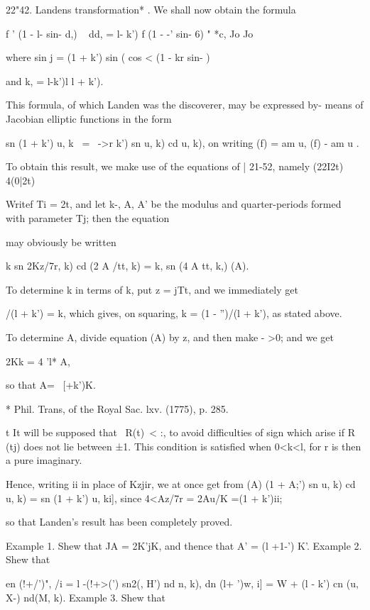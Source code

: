  22"42. Landens transformation* . We shall now obtain the
formula

f ' (1 - l- sin- d,) ~ dd, = l- k') f (1 - -' sin- 6) " *c, Jo Jo

where sin j = (1 + k') sin ( cos < (1 - kr sin- ) ~

and k, = l-k')l l + k').

This formula, of which Landen was the discoverer, may be expressed by-
means of Jacobian elliptic functions in the form

sn (1 + k') u, k \ = \ ->r k') sn u, k) cd u, k), on writing (f) = am
u, (f) - am u .

To obtain this result, we make use of the equations of | 21-52, namely
(22I2t) 4(0|2t)

Writef Ti = 2t, and let k-, A, A' be the modulus and quarter-periods
formed with parameter Tj; then the equation


may obviously be written

k sn 2Kz/7r, k) cd (2 A /tt, k) = k, sn (4 A tt, k,) (A).

To determine k in terms of k, put z = jTt, and we immediately get

  /(l + k') = k, which gives, on squaring, k = (1 - '')/(l + k'), as
stated above.

To determine A, divide equation (A) by z, and then make - >0; and we
get

2Kk = 4 'l* A,

so that A=~ [+k')K.

* Phil. Trans, of the Royal Sac. lxv. (1775), p. 285.

t It will be supposed that \ R(t)\ < :, to avoid difficulties of sign
which arise if R (tj) does not lie between ±1. This condition is
satisfied when 0<k<l, for r is then a pure imaginary.

%
%

Hence, writing ii in place of Kzjir, we at once get from (A) (1 + A;')
sn u, k) cd u, k) = sn (1 + k') u, ki], since 4<Az/7r = 2Au/K =(1 +
k')ii;

so that Landen's result has been completely proved.

Example 1. Shew that JA = 2K'jK, and thence that A' = (l +1-') K'.
Example 2. Shew that

en (!+/')", /i = l -(!+>(') sn2(, H') nd n, k), dn (l+ ')w, i] = W
+ (l - k') cn (u, X-) nd(M, k). Example 3. Shew that

